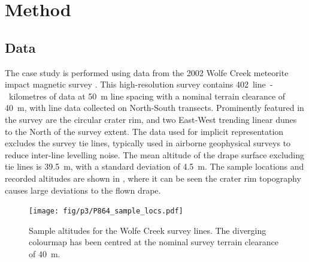 \section{Method}
\subsection{Data}
The case study is performed using data from the 2002 Wolfe Creek meteorite impact magnetic survey \parencite{wolfecreek2019}.
This high-resolution survey contains \qty{402}{line-kilometres} of data at \qty{50}{\m} line spacing with a nominal terrain clearance of \qty{40}{\m}, with line data collected on North-South transects.
Prominently featured in the survey are the circular crater rim, and two East-West trending linear dunes to the North of the survey extent.
The data used for implicit representation excludes the survey tie lines, typically used in airborne geophysical surveys to reduce inter-line levelling noise.
The mean altitude of the drape surface excluding tie lines is \qty{39.5}{\m}, with a standard deviation of \qty{4.5}{\m}.
The sample locations and recorded altitudes are shown in , where it can be seen the crater rim topography causes large deviations to the flown drape.

\begin{figure}[hbt]
    \centering{}
    \texttt{[image: fig/p3/P864\_sample\_locs.pdf]}
    \caption[Point samples]{Sample altitudes for the Wolfe Creek survey lines. The diverging colourmap has been centred at the nominal survey terrain clearance of \qty{40}{\m}.}
    \label{fig:samples}
\end{figure}

